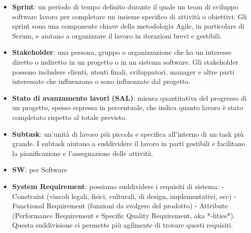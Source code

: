 \documentclass[a4paper,12pt]{article}
\begin{document}
\begin{itemize}
    \item \textbf{Sprint}: un periodo di tempo definito durante il quale un team di sviluppo software lavora per completare un insieme specifico di attività o obiettivi. Gli sprint sono una componente chiave della metodologia Agile, in particolare di Scrum, e aiutano a organizzare il lavoro in iterazioni brevi e gestibili.
    \item \textbf{Stakeholder}: una persona, gruppo o organizzazione che ha un interesse diretto o indiretto in un progetto o in un sistema software. Gli stakeholder possono includere clienti, utenti finali, sviluppatori, manager e altre parti interessate che influenzano o sono influenzate dal progetto.
    \item \textbf{Stato di avanzamento lavori (SAL)}: misura quantitativa del progresso di un progetto, spesso espressa in percentuale, che indica quanto lavoro è stato completato rispetto al totale previsto.
    \item \textbf{Subtask}: un'unità di lavoro più piccola e specifica all'interno di un task più grande. I subtask aiutano a suddividere il lavoro in parti gestibili e facilitano la pianificazione e l'assegnazione delle attività.
    \item \textbf{SW}: per Software
    \item \textbf{System Requirement}: possiamo suddividere i requisiti di sistema: - Constraint (vincoli legali, fisici, culturali, di design, implementativi, ecc) - Functional Requirement (funzioni da svolgere del prodotto) - Attribute (Performance Requirement e Specific Quality Requirement, aka *-lities*). Questa suddivisione ci permette più agilmente di trovare questi requisiti.
\end{itemize}
\end{document}
